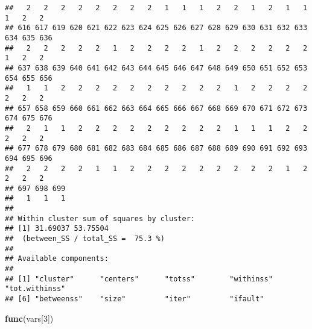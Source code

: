 \documentclass[]{article}
\newenvironment{Shaded}{\begin{snugshade}}{\end{snugshade}}
\newcommand{\DecValTok}[1]{\textcolor[rgb]{0.00,0.00,0.81}{#1}}
\newcommand{\KeywordTok}[1]{\textcolor[rgb]{0.13,0.29,0.53}{\textbf{#1}}}
\newcommand{\NormalTok}[1]{#1}
\begin{document}
\begin{verbatim}
##   2   2   2   2   2   2   2   2   1   1   1   2   2   1   2   1   1   1   2   2 
## 616 617 619 620 621 622 623 624 625 626 627 628 629 630 631 632 633 634 635 636 
##   2   2   2   2   2   1   2   2   2   2   1   2   2   2   2   2   2   1   2   2 
## 637 638 639 640 641 642 643 644 645 646 647 648 649 650 651 652 653 654 655 656 
##   1   1   2   2   2   2   2   2   2   2   2   2   1   2   2   2   2   2   2   2 
## 657 658 659 660 661 662 663 664 665 666 667 668 669 670 671 672 673 674 675 676 
##   2   1   1   2   2   2   2   2   2   2   2   2   1   1   1   2   2   2   2   2 
## 677 678 679 680 681 682 683 684 685 686 687 688 689 690 691 692 693 694 695 696 
##   2   2   2   2   1   1   2   2   2   2   2   2   2   2   2   1   2   2   2   2 
## 697 698 699 
##   1   1   1 
## 
## Within cluster sum of squares by cluster:
## [1] 31.69037 53.75504
##  (between_SS / total_SS =  75.3 %)
## 
## Available components:
## 
## [1] "cluster"      "centers"      "totss"        "withinss"     "tot.withinss"
## [6] "betweenss"    "size"         "iter"         "ifault"
\end{verbatim}

\begin{Shaded}
\begin{Highlighting}[]
\KeywordTok{func}\NormalTok{(vars[}\DecValTok{3}\NormalTok{])}
\end{Highlighting}
\end{Shaded}
\end{document}

